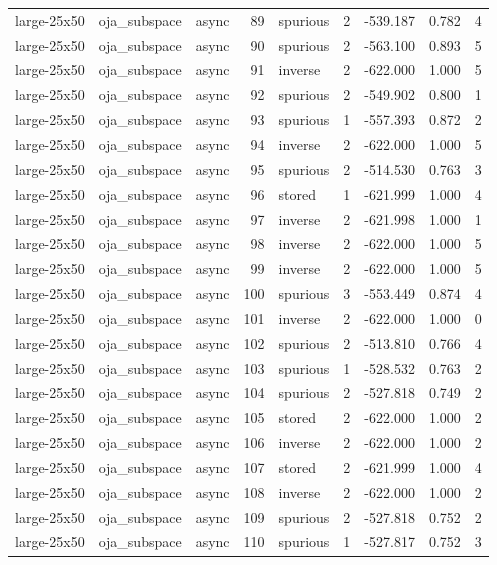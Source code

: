 \begin{tabular}{lllrlrrrr}
large-25x50 & oja\_subspace & async & 89 & spurious & 2 & -539.187 & 0.782 & 4 \\
large-25x50 & oja\_subspace & async & 90 & spurious & 2 & -563.100 & 0.893 & 5 \\
large-25x50 & oja\_subspace & async & 91 & inverse & 2 & -622.000 & 1.000 & 5 \\
large-25x50 & oja\_subspace & async & 92 & spurious & 2 & -549.902 & 0.800 & 1 \\
large-25x50 & oja\_subspace & async & 93 & spurious & 1 & -557.393 & 0.872 & 2 \\
large-25x50 & oja\_subspace & async & 94 & inverse & 2 & -622.000 & 1.000 & 5 \\
large-25x50 & oja\_subspace & async & 95 & spurious & 2 & -514.530 & 0.763 & 3 \\
large-25x50 & oja\_subspace & async & 96 & stored & 1 & -621.999 & 1.000 & 4 \\
large-25x50 & oja\_subspace & async & 97 & inverse & 2 & -621.998 & 1.000 & 1 \\
large-25x50 & oja\_subspace & async & 98 & inverse & 2 & -622.000 & 1.000 & 5 \\
large-25x50 & oja\_subspace & async & 99 & inverse & 2 & -622.000 & 1.000 & 5 \\
large-25x50 & oja\_subspace & async & 100 & spurious & 3 & -553.449 & 0.874 & 4 \\
large-25x50 & oja\_subspace & async & 101 & inverse & 2 & -622.000 & 1.000 & 0 \\
large-25x50 & oja\_subspace & async & 102 & spurious & 2 & -513.810 & 0.766 & 4 \\
large-25x50 & oja\_subspace & async & 103 & spurious & 1 & -528.532 & 0.763 & 2 \\
large-25x50 & oja\_subspace & async & 104 & spurious & 2 & -527.818 & 0.749 & 2 \\
large-25x50 & oja\_subspace & async & 105 & stored & 2 & -622.000 & 1.000 & 2 \\
large-25x50 & oja\_subspace & async & 106 & inverse & 2 & -622.000 & 1.000 & 2 \\
large-25x50 & oja\_subspace & async & 107 & stored & 2 & -621.999 & 1.000 & 4 \\
large-25x50 & oja\_subspace & async & 108 & inverse & 2 & -622.000 & 1.000 & 2 \\
large-25x50 & oja\_subspace & async & 109 & spurious & 2 & -527.818 & 0.752 & 2 \\
large-25x50 & oja\_subspace & async & 110 & spurious & 1 & -527.817 & 0.752 & 3 \\

\end{tabular}
